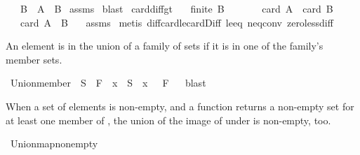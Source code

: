 \begin{isabellebody}
\ \ \ {\isachardoublequoteopen}B\ {\isacharminus}\ A\ {\isasymsubset}\ B{\isachardoublequoteclose}\isanewline
%
\isadelimproof
\isanewline
%
\endisadelimproof
%
\isatagproof
{}\isamarkupfalse%
\ assms\isanewline
{}\isamarkupfalse%
\ blast%
\endisatagproof
{\isafoldproof}%
%
\isadelimproof
\isanewline
%
\endisadelimproof
\isanewline
{}\isamarkupfalse%
\ card{\isacharunderscore}diff{\isacharunderscore}gt{\isacharunderscore}{}{\isacharcolon}\isanewline
\ \ \ {\isachardoublequoteopen}finite\ B{\isachardoublequoteclose}\isanewline
\ \ \ \ \ \ \ {\isachardoublequoteopen}card\ A\ {\isachargreater}\ card\ B{\isachardoublequoteclose}\isanewline
\ \ \ {\isachardoublequoteopen}card\ {\isacharparenleft}A\ {\isacharminus}\ B{\isacharparenright}\ {\isachargreater}\ {}{\isachardoublequoteclose}\isanewline
%
\isadelimproof
%
\endisadelimproof
%
\isatagproof
{}\isamarkupfalse%
\ assms\isanewline
{}\isamarkupfalse%
\ {\isacharparenleft}metis\ diff{\isacharunderscore}card{\isacharunderscore}le{\isacharunderscore}card{\isacharunderscore}Diff\ le{\isacharunderscore}{}{\isacharunderscore}eq\ neq{}{\isacharunderscore}conv\ zero{\isacharunderscore}less{\isacharunderscore}diff{\isacharparenright}%
\endisatagproof
{\isafoldproof}%
%
\isadelimproof
%
\endisadelimproof
%
\isamarkuptrue%
%
\begin{isamarkuptext}%
An element is in the union of a family of sets if it is in one of the family's member sets.%
\end{isamarkuptext}%
\isamarkuptrue%
\isamarkupfalse%
\ Union{\isacharunderscore}member{\isacharcolon}\ {\isachardoublequoteopen}{\isacharparenleft}{\isasymexists}\ S\ {\isasymin}\ F\ {\isachardot}\ x\ {\isasymin}\ S{\isacharparenright}\ {\isasymlongleftrightarrow}\ x\ {\isasymin}\ {\isasymUnion}\ F{\isachardoublequoteclose}%
\isadelimproof
\ %
\endisadelimproof
%
\isatagproof
{}\isamarkupfalse%
\ blast%
\endisatagproof
{\isafoldproof}%
%
\isadelimproof
%
\endisadelimproof
%
\begin{isamarkuptext}%
When a set of elements  is non-empty, and a function  returns a non-empty
  set for at least one member of , the union of the image of  under 
  is non-empty, too.%
\end{isamarkuptext}%
\isamarkuptrue%
\isamarkupfalse%
\ Union{\isacharunderscore}map{\isacharunderscore}non{\isacharunderscore}empty{\isacharcolon}\isanewline

\end{isabellebody}
